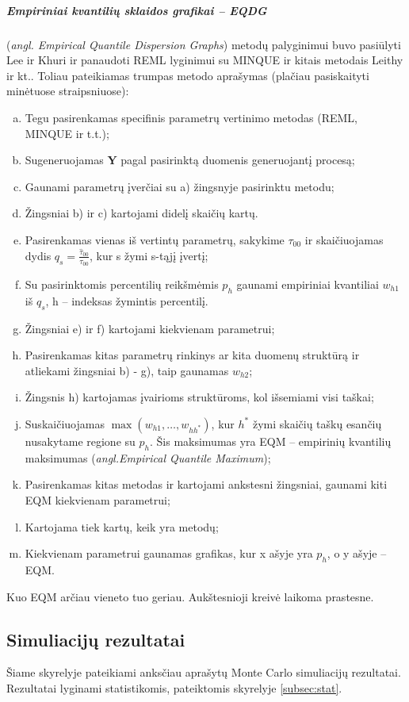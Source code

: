 \documentclass[11pt,a4paper]{article}
\begin{document}
\subparagraph{Empiriniai kvantilių sklaidos grafikai -- EQDG}(\textit{angl. Empirical Quantile Dispersion Graphs}) metodų palyginimui buvo pasiūlyti Lee ir Khuri\cite{eqdg1} ir panaudoti REML lyginimui su MINQUE ir kitais metodais Leithy ir kt.\cite{MMINQUE}. Toliau pateikiamas trumpas metodo aprašymas (plačiau pasiskaityti minėtuose straipsniuose):
\begin{enumerate}[a)] 
\item Tegu pasirenkamas specifinis parametrų vertinimo metodas (REML, MINQUE ir t.t.);
\item Sugeneruojamas $\mathbf{Y}$ pagal pasirinktą duomenis generuojantį procesą;
\item Gaunami parametrų įverčiai su a) žingsnyje pasirinktu metodu;
\item Žingsniai b) ir c) kartojami didelį skaičių kartų.
\item Pasirenkamas vienas iš vertintų parametrų, sakykime $\tau_{00}$ ir skaičiuojamas dydis $q_s=\frac{\hat{\tau}_{00}}{\tau_{00}}$, kur s žymi s-tąjį įvertį;
\item Su pasirinktomis percentilių reikšmėmis $p_h$ gaunami empiriniai kvantiliai $w_{h1}$ iš $q_s$, h -- indeksas žymintis percentilį.
\item Žingsniai e) ir f) kartojami kiekvienam parametrui;
\item Pasirenkamas kitas parametrų rinkinys ar kita duomenų struktūrą ir atliekami žingsniai b) - g), taip gaunamas $w_{h2}$;
\item Žingsnis h) kartojamas įvairioms struktūroms, kol išsemiami visi taškai;
\item Suskaičiuojamas $\max (w_{h1},\dots,w_{hh^*})$, kur $h^*$ žymi skaičių taškų esančių nusakytame regione su $p_h$. Šis maksimumas yra EQM -- empirinių kvantilių maksimumas (\textit{angl.Empirical Quantile Maximum});
\item Pasirenkamas kitas metodas ir kartojami ankstesni žingsniai, gaunami kiti EQM kiekvienam parametrui;
\item Kartojama tiek kartų, keik yra metodų;
\item Kiekvienam parametrui gaunamas grafikas, kur x ašyje yra $p_h$, o y ašyje -- EQM.
\end{enumerate}
\indent Kuo EQM arčiau vieneto tuo geriau. Aukštesnioji kreivė laikoma prastesne.


\subsection{Simuliacijų rezultatai}\label{subsec:simrez}
\indent Šiame skyrelyje pateikiami anksčiau aprašytų Monte Carlo simuliacijų rezultatai. Rezultatai lyginami statistikomis, pateiktomis skyrelyje \ref{subsec:stat}.
\end{document}
